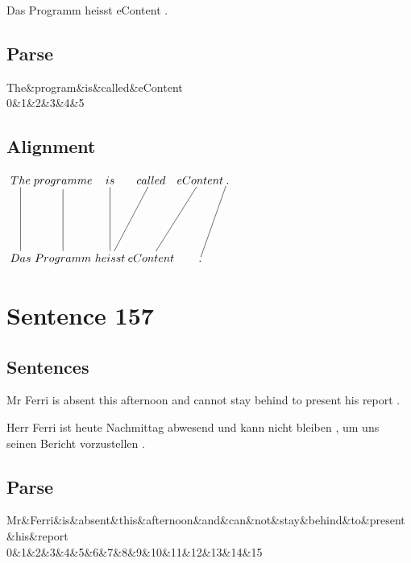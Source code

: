 \documentclass{report}
\begin{document}
\noindent Das Programm heisst eContent .



\subsection*{Parse}
\begin{dependency}[theme=simple]
\begin{deptext}[column sep=.5cm, row sep=.1ex]
The\&program\&is\&called\&eContent\\
0\&1\&2\&3\&4\&5\\
\end{deptext}
\end{dependency}


\subsection*{Alignment}
\scriptsize{
$
\xymatrix@C-2.3pc{
The \ar @{-} [dd] & programme \ar @{-} [dd] & is \ar @{-} [dd] & called \ar @{-} [ddl] & eContent \ar @{-} [ddl] & . \ar @{-} [ddl]\\\\
Das & Programm & heisst & eContent & .
}$}
\newpage\section*{Sentence 157}

\subsection*{Sentences}
Mr Ferri is absent this afternoon and cannot stay behind to present his report .

\noindent Herr Ferri ist heute Nachmittag abwesend und kann nicht bleiben , um uns seinen Bericht vorzustellen .



\subsection*{Parse}
\begin{dependency}[theme=simple]
\begin{deptext}[column sep=.5cm, row sep=.1ex]
Mr\&Ferri\&is\&absent\&this\&afternoon\&and\&can\&not\&stay\&behind\&to\&present\&his\&report\\
0\&1\&2\&3\&4\&5\&6\&7\&8\&9\&10\&11\&12\&13\&14\&15\\
\end{deptext}
\end{dependency}
\end{document}
